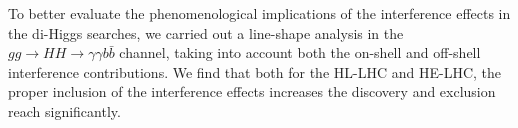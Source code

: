 To better evaluate the phenomenological implications of the interference effects in the di-Higgs searches, we carried out a line-shape analysis in the $gg\to HH \to \gamma\gamma b\bar b$ channel, taking into account both the on-shell and off-shell interference contributions. We find that both for the HL-LHC and HE-LHC, the proper inclusion of the interference effects increases the discovery and exclusion reach significantly.

